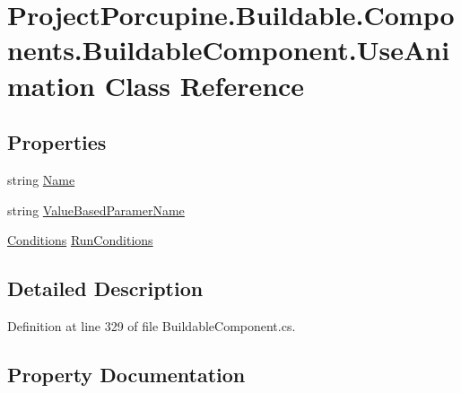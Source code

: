 \hypertarget{class_project_porcupine_1_1_buildable_1_1_components_1_1_buildable_component_1_1_use_animation}{}\section{Project\+Porcupine.\+Buildable.\+Components.\+Buildable\+Component.\+Use\+Animation Class Reference}
\label{class_project_porcupine_1_1_buildable_1_1_components_1_1_buildable_component_1_1_use_animation}
\subsection*{Properties}
\begin{DoxyCompactItemize}
\item 
string \hyperlink{class_project_porcupine_1_1_buildable_1_1_components_1_1_buildable_component_1_1_use_animation_ae455a10b32880ccd050af1facc5cd618}{Name}
\item 
string \hyperlink{class_project_porcupine_1_1_buildable_1_1_components_1_1_buildable_component_1_1_use_animation_a0f58f2ef422baede427bd72073f3b341}{Value\+Based\+Paramer\+Name}
\item 
\hyperlink{class_project_porcupine_1_1_buildable_1_1_components_1_1_buildable_component_1_1_conditions}{Conditions} \hyperlink{class_project_porcupine_1_1_buildable_1_1_components_1_1_buildable_component_1_1_use_animation_a0758d6ee903d09e51893e36713cc8758}{Run\+Conditions}
\end{DoxyCompactItemize}


\subsection{Detailed Description}


Definition at line 329 of file Buildable\+Component.\+cs.



\subsection{Property Documentation}
\mbox{\label{class_project_porcupine_1_1_buildable_1_1_components_1_1_buildable_component_1_1_use_animation_ae455a10b32880ccd050af1facc5cd618}} 
